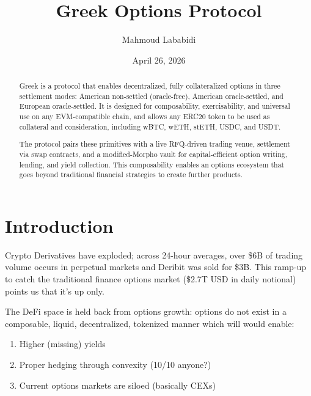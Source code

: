 \documentclass[%
 reprint,
 amsmath,amssymb,
 aps,
 prl,
floatfix,
]{revtex4-2}
\newcommand{\greekfi}{Greek }
\begin{document}
\title{\greekfi Options Protocol}

\author{Mahmoud Lababidi}

\date{April 26, 2026}

\begin{abstract}
\greekfi is a protocol that enables decentralized, fully collateralized options
in three settlement modes: American non-settled (oracle-free), American oracle-settled,
and European oracle-settled.
It is designed for composability, exercisability, and universal use
on any EVM-compatible chain, and allows any ERC20 token to be used as
collateral and consideration, including wBTC, wETH, stETH, USDC, and USDT.

The protocol pairs these primitives with a live RFQ-driven trading venue,
settlement via swap contracts, and a modified-Morpho vault for capital-efficient option writing, lending, and yield collection.
This composability enables an options ecosystem that goes beyond
traditional financial strategies to create further products.

\end{abstract}

\maketitle

\section{Introduction}

Crypto Derivatives have exploded; across 24-hour averages, 
over \$6B of trading volume occurs in perpetual markets and Deribit was sold for \$3B. 
This ramp-up to catch the traditional finance options market (\$2.7T USD in daily notional)
points us that it's up only.

The DeFi space is held back from options growth: 
options do not exist in a composable, liquid, decentralized, tokenized manner 
which will would enable:
\begin{enumerate}
  \item Higher (missing) yields
  \item Proper hedging through convexity (10/10 anyone?)
  \item Current options markets are siloed (basically CEXs)
\end{enumerate}
\end{document}
